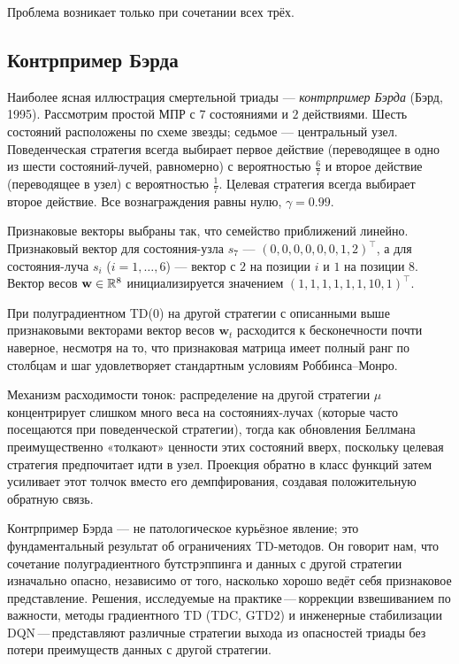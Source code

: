 Проблема возникает только при сочетании всех трёх.

\subsection{Контрпример Бэрда}
\label{subsec:baird}

Наиболее ясная иллюстрация смертельной триады --- \emph{контрпример Бэрда} (Бэрд, 1995).  Рассмотрим простой МПР с $7$ состояниями и $2$ действиями.  Шесть состояний расположены по схеме звезды; седьмое --- центральный узел.  Поведенческая стратегия всегда выбирает первое действие (переводящее в одно из шести состояний-лучей, равномерно) с вероятностью $\frac{6}{7}$ и второе действие (переводящее в узел) с вероятностью $\frac{1}{7}$.  Целевая стратегия всегда выбирает второе действие.  Все вознаграждения равны нулю, $\gamma = 0.99$.

Признаковые векторы выбраны так, что семейство приближений линейно.  Признаковый вектор для состояния-узла $s_7$ --- $(0,0,0,0,0,0,1,2)^\top$, а для состояния-луча $s_i$ ($i = 1, \ldots, 6$) --- вектор с $2$ на позиции $i$ и $1$ на позиции $8$.  Вектор весов $\mathbf{w} \in \mathbb{R}^8$ инициализируется значением $(1,1,1,1,1,1,10,1)^\top$.

\begin{theorem}
\label{thm:baird}
При полуградиентном TD(0) на другой стратегии с описанными выше признаковыми векторами вектор весов $\mathbf{w}_t$ расходится к бесконечности почти наверное, несмотря на то, что признаковая матрица имеет полный ранг по столбцам и шаг удовлетворяет стандартным условиям Роббинса--Монро.
\end{theorem}

Механизм расходимости тонок: распределение на другой стратегии $\mu$ концентрирует слишком много веса на состояниях-лучах (которые часто посещаются при поведенческой стратегии), тогда как обновления Беллмана преимущественно «толкают» ценности этих состояний вверх, поскольку целевая стратегия предпочитает идти в узел.  Проекция обратно в класс функций затем усиливает этот толчок вместо его демпфирования, создавая положительную обратную связь.

\begin{remark}
\label{rem:baird-lesson}
Контрпример Бэрда --- не патологическое курьёзное явление; это фундаментальный результат об ограничениях TD-методов.  Он говорит нам, что сочетание полуградиентного бутстрэппинга и данных с другой стратегии изначально опасно, независимо от того, насколько хорошо ведёт себя признаковое представление.  Решения, исследуемые на практике\,---\,коррекции взвешиванием по важности, методы градиентного TD (TDC, GTD2) и инженерные стабилизации DQN\,---\,представляют различные стратегии выхода из опасностей триады без потери преимуществ данных с другой стратегии.
\end{remark}


